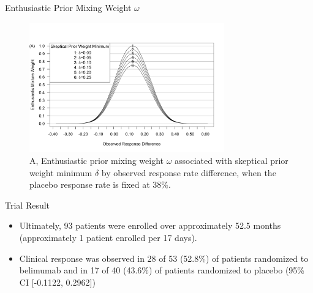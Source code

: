 \documentclass{beamer}
\begin{document}
\begin{frame}{Enthusiastic Prior Mixing Weight $\omega$}

\vspace{-0.5cm}
\begin{figure}[htbp]
\begin{center}
\includegraphics[width=0.75\textwidth]{./figures/3-part-compatibility-2.png}
    \caption{A, Enthusiastic prior mixing weight $\omega$ associated with skeptical prior weight minimum $\delta$ by observed response rate difference, when the placebo response rate is fixed at $38\%$.}
\label{fig:ex2varyomega}
 \end{center}
\end{figure}
\end{frame}


\begin{frame}{Trial Result}
\begin{itemize}
\item Ultimately, 93 patients were enrolled over approximately 52.5 months (approximately 1 patient enrolled per 17 days).
%
\item Clinical response was observed in 28 of 53 (52.8\%) of patients randomized to belimumab and in 17 of 40 (43.6\%) of patients randomized to placebo (95\% CI [-0.1122, 0.2962])
\end{itemize}
\end{frame}
\end{document}
